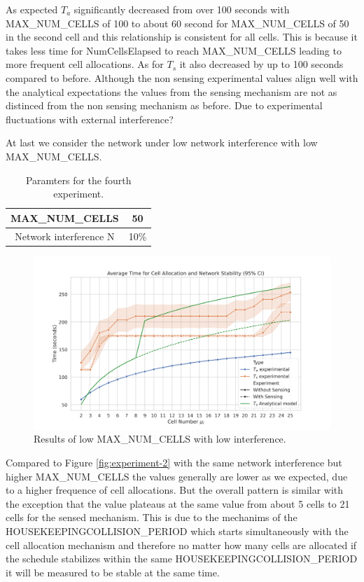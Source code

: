 \documentclass{comnets-thesis}
\begin{document}
As expected $T_a$ significantly decreased from over 100 seconds with MAX\_NUM\_CELLS of 100 to about 60 second for MAX\_NUM\_CELLS of 50 in the second cell and this relationship is consistent for all cells. This is because it takes less time for NumCellsElapsed to reach MAX\_NUM\_CELLS leading to more frequent cell allocations. 
As for $T_s$ it also decreased by up to 100 seconds compared to before. Although the non sensing experimental values align well with the analytical expectations the values from the sensing mechanism are not as distinced from the non sensing mechanism as before. Due to experimental fluctuations with external interference?


At last we consider the network under low network interference with low MAX\_NUM\_CELLS.

\begin{table}[h]
    \centering
    \caption{Paramters for the fourth experiment.}
    \begin{tabular}{|c|c|}
    \hline
    MAX\_NUM\_CELLS & 50 \\ \hline
    Network interference N & 10\%  \\ \hline
    \end{tabular}
\end{table}

\begin{figure}[H]
    \centering
    \includegraphics[width=1\textwidth]{./images/experiment4.png}
    \caption{Results of low MAX\_NUM\_CELLS with low interference.}
    \label{fig:experiment-4}
\end{figure}

Compared to Figure \ref{fig:experiment-2} with the same network interference but higher MAX\_NUM\_CELLS the values generally are lower as we expected, due to a higher frequence of cell allocations.
But the overall pattern is similar with the exception that the value plateaus at the same value from about 5 cells to 21 cells for the sensed mechanism. This is due to the mechanims of the HOUSEKEEPINGCOLLISION\_PERIOD which starts simultaneously with the cell allocation mechanism and therefore no matter how many cells are allocated if the schedule stabilizes within the same HOUSEKEEPINGCOLLISION\_PERIOD it will be measured to be stable at the same time.
\end{document}
